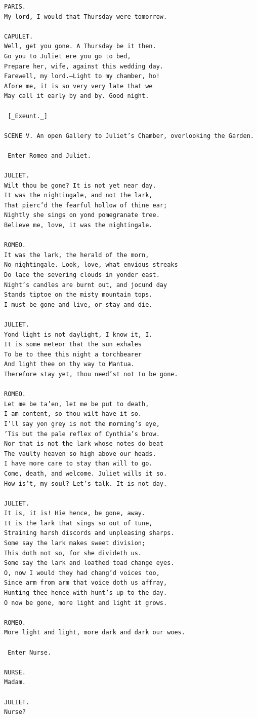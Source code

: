 \documentclass{article}
\begin{document}
\begin{verbatim}
PARIS.
My lord, I would that Thursday were tomorrow.

CAPULET.
Well, get you gone. A Thursday be it then.
Go you to Juliet ere you go to bed,
Prepare her, wife, against this wedding day.
Farewell, my lord.—Light to my chamber, ho!
Afore me, it is so very very late that we
May call it early by and by. Good night.

 [_Exeunt._]

SCENE V. An open Gallery to Juliet’s Chamber, overlooking the Garden.

 Enter Romeo and Juliet.

JULIET.
Wilt thou be gone? It is not yet near day.
It was the nightingale, and not the lark,
That pierc’d the fearful hollow of thine ear;
Nightly she sings on yond pomegranate tree.
Believe me, love, it was the nightingale.

ROMEO.
It was the lark, the herald of the morn,
No nightingale. Look, love, what envious streaks
Do lace the severing clouds in yonder east.
Night’s candles are burnt out, and jocund day
Stands tiptoe on the misty mountain tops.
I must be gone and live, or stay and die.

JULIET.
Yond light is not daylight, I know it, I.
It is some meteor that the sun exhales
To be to thee this night a torchbearer
And light thee on thy way to Mantua.
Therefore stay yet, thou need’st not to be gone.

ROMEO.
Let me be ta’en, let me be put to death,
I am content, so thou wilt have it so.
I’ll say yon grey is not the morning’s eye,
’Tis but the pale reflex of Cynthia’s brow.
Nor that is not the lark whose notes do beat
The vaulty heaven so high above our heads.
I have more care to stay than will to go.
Come, death, and welcome. Juliet wills it so.
How is’t, my soul? Let’s talk. It is not day.

JULIET.
It is, it is! Hie hence, be gone, away.
It is the lark that sings so out of tune,
Straining harsh discords and unpleasing sharps.
Some say the lark makes sweet division;
This doth not so, for she divideth us.
Some say the lark and loathed toad change eyes.
O, now I would they had chang’d voices too,
Since arm from arm that voice doth us affray,
Hunting thee hence with hunt’s-up to the day.
O now be gone, more light and light it grows.

ROMEO.
More light and light, more dark and dark our woes.

 Enter Nurse.

NURSE.
Madam.

JULIET.
Nurse?


\end{verbatim}
\end{document}
